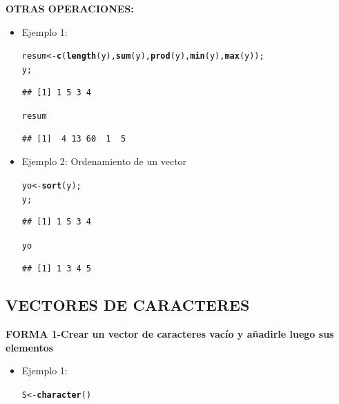 \documentclass[12pt,letterpaper]{article}\usepackage[]{graphicx}\usepackage[]{color}
\makeatletter
\newcommand{\hlstd}[1]{\textcolor[rgb]{0.345,0.345,0.345}{#1}}%
\newcommand{\hlkwb}[1]{\textcolor[rgb]{0.69,0.353,0.396}{#1}}%
\newcommand{\hlkwd}[1]{\textcolor[rgb]{0.737,0.353,0.396}{\textbf{#1}}}%
\newenvironment{kframe}{%
 \def\at@end@of@kframe{}%
 \ifinner\ifhmode%
  \def\at@end@of@kframe{\end{minipage}}%
  \begin{minipage}{\columnwidth}%
 \fi\fi%
 \def\FrameCommand##1{\hskip\@totalleftmargin \hskip-\fboxsep
 \colorbox{shadecolor}{##1}\hskip-\fboxsep
     \hskip-\linewidth \hskip-\@totalleftmargin \hskip\columnwidth}%
 \MakeFramed {\advance\hsize-\width
   \@totalleftmargin\z@ \linewidth\hsize
   \@setminipage}}%
 {\par\unskip\endMakeFramed%
 \at@end@of@kframe}
\newenvironment{knitrout}{}{} %
\makeatother
\begin{document}
\textbf{OTRAS OPERACIONES:}
\begin{itemize}
\item Ejemplo 1:
\begin{knitrout}
\color{fgcolor}\begin{kframe}
\begin{alltt}
\hlstd{resum} \hlkwb{<-} \hlkwd{c}\hlstd{(}\hlkwd{length}\hlstd{(y),} \hlkwd{sum}\hlstd{(y),} \hlkwd{prod}\hlstd{(y),} \hlkwd{min}\hlstd{(y),} \hlkwd{max}\hlstd{(y));}
\hlstd{y;}
\end{alltt}
\begin{verbatim}
## [1] 1 5 3 4
\end{verbatim}
\begin{alltt}
\hlstd{resum}
\end{alltt}
\begin{verbatim}
## [1]  4 13 60  1  5
\end{verbatim}
\end{kframe}
\end{knitrout}
\item Ejemplo 2: Ordenamiento de un vector
\begin{knitrout}
\color{fgcolor}\begin{kframe}
\begin{alltt}
\hlstd{yo} \hlkwb{<-} \hlkwd{sort}\hlstd{(y);}
\hlstd{y;}
\end{alltt}
\begin{verbatim}
## [1] 1 5 3 4
\end{verbatim}
\begin{alltt}
\hlstd{yo}
\end{alltt}
\begin{verbatim}
## [1] 1 3 4 5
\end{verbatim}
\end{kframe}
\end{knitrout}
\end{itemize}

\subsection{VECTORES DE CARACTERES}
\textbf {FORMA 1-Crear un vector de caracteres vac\'io y a\~nadirle luego sus elementos}
\begin{itemize}
\item Ejemplo 1:
\begin{knitrout}
\color{fgcolor}\begin{kframe}
\begin{alltt}
\hlstd{S}\hlkwb{<-}\hlkwd{character}\hlstd{()}
\end{alltt}
\end{kframe}
\end{knitrout}
\end{itemize}
\end{document}
